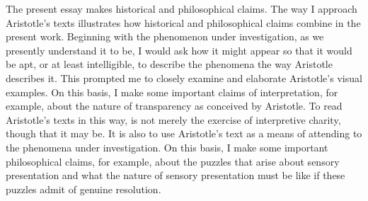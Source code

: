 The present essay makes historical and philosophical claims. The way I approach Aristotle's texts illustrates how historical and philosophical claims combine in the present work. Beginning with the phenomenon under investigation, as we presently understand it to be, I would ask how it might appear so that it would be apt, or at least intelligible, to describe the phenomena the way Aristotle describes it. This prompted me to closely examine and elaborate Aristotle's visual examples. On this basis, I make some important claims of interpretation, for example, about the nature of transparency as conceived by Aristotle. To read Aristotle's texts in this way, is not merely the exercise of interpretive charity, though that it may be. It is also to use Aristotle's text as a means of attending to the phenomena under investigation. On this basis, I make some important philosophical claims, for example, about the puzzles that arise about sensory presentation and what the nature of sensory presentation must be like if these puzzles admit of genuine resolution.

